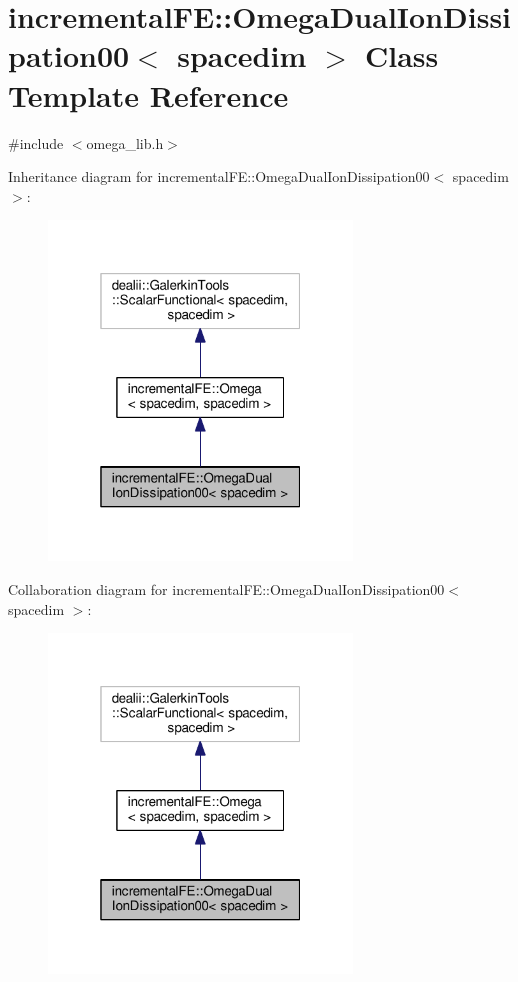\hypertarget{classincremental_f_e_1_1_omega_dual_ion_dissipation00}{}\section{incremental\+FE\+:\+:Omega\+Dual\+Ion\+Dissipation00$<$ spacedim $>$ Class Template Reference}
\label{classincremental_f_e_1_1_omega_dual_ion_dissipation00}


{\ttfamily \#include $<$omega\+\_\+lib.\+h$>$}



Inheritance diagram for incremental\+FE\+:\+:Omega\+Dual\+Ion\+Dissipation00$<$ spacedim $>$\+:\nopagebreak
\begin{figure}[H]
\begin{center}
\leavevmode
\includegraphics[width=229pt]{classincremental_f_e_1_1_omega_dual_ion_dissipation00__inherit__graph}
\end{center}
\end{figure}


Collaboration diagram for incremental\+FE\+:\+:Omega\+Dual\+Ion\+Dissipation00$<$ spacedim $>$\+:\nopagebreak
\begin{figure}[H]
\begin{center}
\leavevmode
\includegraphics[width=229pt]{classincremental_f_e_1_1_omega_dual_ion_dissipation00__coll__graph}
\end{center}
\end{figure}
